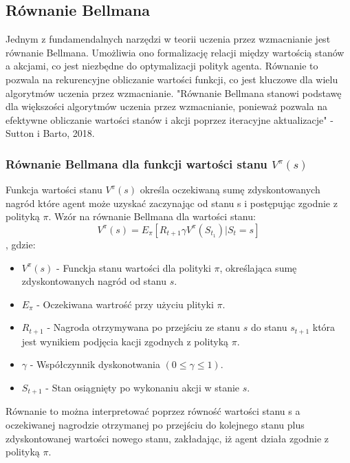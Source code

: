 \documentclass[a4paper, 12pt]{article}
\begin{document}
    \subsection{Równanie Bellmana}
    Jednym z fundamendalnych narzędzi w teorii uczenia przez wzmacnianie jest równanie Bellmana.
    Umożliwia ono formalizację relacji między wartością stanów a akcjami, co jest niezbędne do optymalizacji polityk agenta.
    Równanie to pozwala na rekurencyjne obliczanie wartości funkcji, co jest kluczowe dla wielu algorytmów uczenia przez wzmacnianie.
    "Równanie Bellmana stanowi podstawę dla większości algorytmów uczenia przez wzmacnianie, ponieważ pozwala na efektywne obliczanie wartości stanów i akcji poprzez iteracyjne aktualizacje"
    - Sutton i Barto, 2018.
    \subsubsection{Równanie Bellmana dla funkcji wartości stanu \( V^\pi(s) \)}
    Funkcja wartości stanu \( V^\pi(s) \) określa oczekiwaną sumę zdyskontowanych nagród które agent może uzyskać zaczynając od stanu s
    i postępując zgodnie z polityką \( \pi \). Wzór na równanie Bellmana dla wartości stanu:
    \[ V^\pi(s) = E_\pi[R_{t+1}  \gamma V^\pi(S_{t_1})|S_t = s] \],
    gdzie:
    \begin{itemize}
        \item \( V^\pi(s) \) - Funckja stanu wartości dla polityki \( \pi \), określająca sumę zdyskontowanych nagród od stanu \( s \).
        \item \( E_\pi \) - Oczekiwana wartrość przy użyciu plityki \( \pi \).
        \item \( R_{t+1} \) - Nagroda otrzymywana po przejściu ze stanu \( s \) do stanu \( s_{t+1} \) która jest wynikiem podjęcia kacji zgodnych z polityką \( \pi \).
        \item \( \gamma \) - Współczynnik dyskonotwania \( (0 \leq \gamma \leq 1) \).
        \item \( S_{t+1} \) - Stan osiągnięty po wykonaniu akcji w stanie \( s \).
    \end{itemize}
    Równanie to można interpretować poprzez równość wartości stanu s a oczekiwanej nagrodzie otrzymanej po przejściu do kolejnego stanu plus zdyskontowanej wartości nowego stanu,
    zakładając, iż agent działa zgodnie z polityką \( \pi \).
\end{document}
